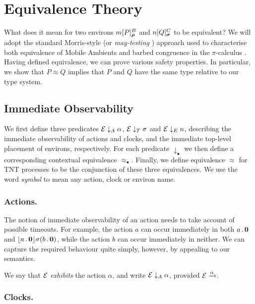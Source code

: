 \documentclass[orivec,envcountsame]{llncs}
\newcommand{\Exhibits}[1]{\mathrel{\downarrow_{#1}}}
\newcommand{\ExhibitsA}{\Exhibits{A}}
\newcommand{\ExhibitsC}{\Exhibits{T}}
\newcommand{\ExhibitsE}{\Exhibits{E}}
\newcommand{\Eq}{\approx}
\newcommand{\Does}[1]{\xderives{#1}}
\begin{document}
\section{Equivalence Theory}
\label{sec:equivalence-theory}

What does it mean for two environs $\locv{m}{P}{B}{\vec\rho}$ and
$\locv{n}{Q}{C}{\vec\sigma}$ to be equivalent? We will adopt the standard Morris-style  \cite{Mor68} (or \emph{may-testing} \cite{DNH84}) approach used to characterise
both equivalence of Mobile Ambients \cite{GC99} and barbed congruence in the
$\pi$-calculus \cite{sangiorgi:book}. Having defined equivalence, we can prove various
safety properties. In particular, we show that $P \Eq Q$ implies that $P$ and
$Q$ have the same type relative to our type system.

\subsection{Immediate Observability}
\label{sec:immediate-observability}

We first define three predicates $\expr \ExhibitsA \alpha$, $\expr \ExhibitsC
\sigma$ and $\expr \ExhibitsE n$, describing the immediate observability of
actions and clocks, and the immediate top-level placement of environs,
respectively. For each predicate $\Exhibits{\bullet}$ we then define a
corresponding contextual equivalence $\Eq_{\bullet}$. Finally, we define
equivalence $\Eq$ for TNT processes to be the conjunction of these three
equivalences. We use the word \emph{symbol} to mean any action, clock or environ
name.

\subsubsection{Actions.}
The notion of immediate observability of an action needs to take account
of possible timeouts. For example, the action $a$ can occur immediately
in both $a\,.\,\textbf{0}$ and $\lfloor{a\,.\,\textbf{0}}\rfloor {\sigma} ({b\,.\,\textbf{0}})$,
while the action $b$ can occur immediately in neither. We can capture
the required behaviour quite simply, however, by appealing to our
semantics.

\begin{definition}
We say that $\text{$\mathcal{E}$}$ \emph{exhibits} the action $\alpha$, and write
$\expr \ExhibitsA \alpha$, provided $\expr \Does{\alpha}$.
\end{definition}


\subsubsection{Clocks.} 
\end{document}
